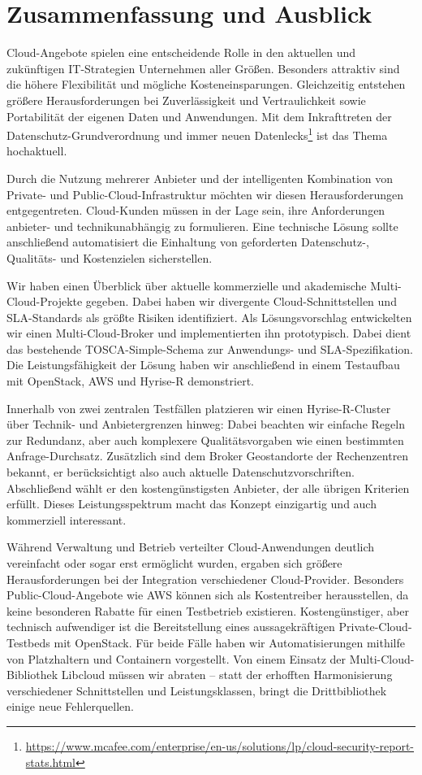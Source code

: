 \chapter{Zusammenfassung und Ausblick}

Cloud-Angebote spielen eine entscheidende Rolle in den aktuellen und zukünftigen IT-Strategien Unternehmen aller Größen. Besonders attraktiv sind die höhere Flexibilität und mögliche Kosteneinsparungen. Gleichzeitig entstehen größere Herausforderungen bei Zuverlässigkeit und Vertraulichkeit sowie Portabilität der eigenen Daten und Anwendungen. Mit dem Inkrafttreten der Datenschutz-Grundverordnung und immer neuen Datenlecks\footnote{\url{https://www.mcafee.com/enterprise/en-us/solutions/lp/cloud-security-report-stats.html}} ist das Thema hochaktuell.

Durch die Nutzung mehrerer Anbieter und der intelligenten Kombination von Private- und Public-Cloud-Infrastruktur möchten wir diesen Herausforderungen entgegentreten. Cloud-Kunden müssen in der Lage sein, ihre Anforderungen anbieter- und technikunabhängig zu formulieren. Eine technische Lösung sollte anschließend automatisiert die Einhaltung von geforderten Datenschutz-, Qualitäts- und Kostenzielen sicherstellen.

Wir haben einen Überblick über aktuelle kommerzielle und akademische Multi-Cloud-Projekte gegeben. Dabei haben wir divergente Cloud-Schnittstellen und SLA-Standards als größte Risiken identifiziert. Als Lösungsvorschlag entwickelten wir einen Multi-Cloud-Broker und implementierten ihn prototypisch. Dabei dient das bestehende TOSCA-Simple-Schema zur Anwendungs- und SLA-Spezi\-fi\-ka\-tion. Die Leistungsfähigkeit der Lösung haben wir anschließend in einem Testaufbau mit OpenStack, AWS und Hyrise-R demonstriert.

Innerhalb von zwei zentralen Testfällen platzieren wir einen Hyrise-R-Cluster über Technik- und Anbietergrenzen hinweg: Dabei beachten wir einfache Regeln zur Redundanz, aber auch komplexere Qualitätsvorgaben wie einen bestimmten Anfrage-Durchsatz. Zusätzlich sind dem Broker Geostandorte der Rechenzentren bekannt, er berücksichtigt also auch aktuelle Datenschutzvorschriften. Abschließend wählt er den kostengünstigsten Anbieter, der alle übrigen Kriterien erfüllt. Dieses Leistungsspektrum macht das Konzept einzigartig und auch kommerziell interessant.

Während Verwaltung und Betrieb verteilter Cloud-Anwendungen deutlich vereinfacht oder sogar erst ermöglicht wurden, ergaben sich größere Herausforderungen bei der Integration verschiedener Cloud-Provider. Besonders Public-Cloud-Angebote wie AWS können sich als Kostentreiber herausstellen, da keine besonderen Rabatte für einen Testbetrieb existieren. Kostengünstiger, aber technisch aufwendiger ist die Bereitstellung eines aussagekräftigen Private-Cloud-Testbeds mit OpenStack. Für beide Fälle haben wir Automatisierungen mithilfe von Platzhaltern und Containern vorgestellt. Von einem Einsatz der Multi-Cloud-Bibliothek Libcloud müssen wir abraten -- statt der erhofften Harmonisierung verschiedener Schnittstellen und Leistungsklassen, bringt die Drittbibliothek einige neue Fehlerquellen.

